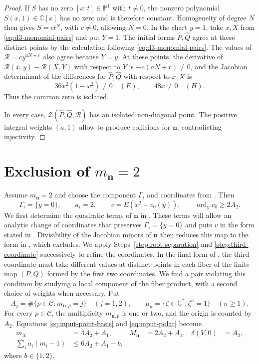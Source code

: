 \documentclass[11pt,letterpaper]{article}
\numberwithin{equation}{section}
\theoremstyle{remark}
\theoremstyle{plain}
\newcommand{\C}{\mathbb{C}}
\newcommand{\ord}{\operatorname{ord}}
\begin{document}
\begin{proof}
If $S$ has no zero $[x:t]\in\mathbb P^1$ with $t\neq0$, the nonzero polynomial
$S(x,1)\in\C[x]$ has no zero and is therefore constant.
Homogeneity of degree $N$ then gives $S=ct^N$, with $c\neq0$,
allowing $N=0$.  In the chart $y=1$, take $x,X$ from
\eqref{eq:d3-monomial-pairs} and put $Y=1$.
The initial forms $\widehat P,\widehat Q$ agree at these distinct points by the
calculation following \eqref{eq:d3-monomial-pairs}.  The values of
$\mathcal R=cy^{aN+r}$ also agree because $Y=y$.
At these points, the derivative of $\mathcal R(x,y)-\mathcal R(X,Y)$
with respect to $Y$ is $-c(aN+r)\neq0$, and the Jacobian determinant of
the differences for $\widehat P,\widehat Q$ with respect to $x,X$ is
\[
 36x^2(1-\omega^2)\neq0\quad(E),\qquad48x\neq0\quad(H).
\]
Thus the common zero is isolated.

In every case, $\mathcal Z(\widehat P,\widehat Q,\mathcal R)$
has an isolated non-diagonal point.  The positive integral weights
$(a,1)$ allow  to produce collisions
for $\boldsymbol n$, contradicting injectivity.
\end{proof}
\section{Exclusion of
\texorpdfstring{$m_{\boldsymbol{n}}=2$}{m(n)=2}}
\label{sec:dtwo}

Assume $m_{\boldsymbol n}=2$ and choose the component $\Gamma_i$
and coordinates from .  Then
\[
 \Gamma_i=\{y=0\},\qquad a_i=2,\qquad
 v=E(x^2+c_0(y)),\qquad \ord_yc_0\geq2A_2.
\]
We first determine the quadratic terms of $\boldsymbol n$ in
.  These terms will allow an analytic change
of coordinates that preserves $\Gamma_i=\{y=0\}$ and puts $v$ in the
form stated in .
Divisibility of the Jacobian minors of $\boldsymbol n$ then reduces this map to the
form in , which
 excludes.
We apply Steps~\ref{step:root-separation} and
\ref{step:third-coordinate} successively to refine the
coordinates.  In the final form of ,
the third coordinate must take different values at distinct points in
each fiber of the finite map $(P,Q)$ formed by the first two coordinates.
We find a pair violating this condition by studying a local component
of the fiber product, with a second choice of weights when necessary.
Put
\[
 A_j=\#\{p\in\mathcal C:m_{\boldsymbol n,p}=j\}\quad(j=1,2),
 \qquad \mu_n=\{\zeta\in\C^*:\zeta^n=1\}\quad(n\geq1).
\]
For every $p\in\mathcal C$, the multiplicity $m_{\boldsymbol n,p}$
is one or two, and the origin is counted by $A_2$.  Equations \eqref{eq:input-point-basis} and
\eqref{eq:input-polar} become
\begin{align}
 m_X&=4A_2+A_1,& M_{\boldsymbol n}&=2A_2+A_1,&
 \delta(V,0)&=A_2,                                  \label{eq:d2-counts}\\
 \sum_i a_i(m_i-1)&\leq6A_2+A_1-b,&&&                 \label{eq:d2-polar}
\end{align}
where $b\in\{1,2\}$.
\end{document}
